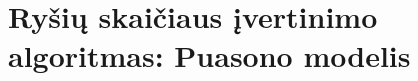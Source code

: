 \documentclass[10pt]{article}
\begin{document}
%
%
%
%
%
%
%
%




\section{Ryšių skaičiaus įvertinimo algoritmas: Puasono modelis}

%
\end{document}
